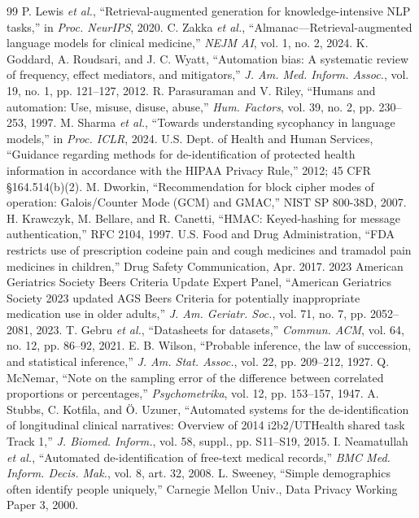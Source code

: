 \documentclass[journal]{IEEEtran}
\begin{document}
\begin{thebibliography}{99}
 P. Lewis \emph{et al.}, ``Retrieval-augmented generation for knowledge-intensive NLP tasks,'' in \emph{Proc. NeurIPS}, 2020.
 C. Zakka \emph{et al.}, ``Almanac---Retrieval-augmented language models for clinical medicine,'' \emph{NEJM AI}, vol. 1, no. 2, 2024.
 K. Goddard, A. Roudsari, and J. C. Wyatt, ``Automation bias: A systematic review of frequency, effect mediators, and mitigators,'' \emph{J. Am. Med. Inform. Assoc.}, vol. 19, no. 1, pp. 121--127, 2012.
 R. Parasuraman and V. Riley, ``Humans and automation: Use, misuse, disuse, abuse,'' \emph{Hum. Factors}, vol. 39, no. 2, pp. 230--253, 1997.
 M. Sharma \emph{et al.}, ``Towards understanding sycophancy in language models,'' in \emph{Proc. ICLR}, 2024.
 U.S. Dept. of Health and Human Services, ``Guidance regarding methods for de-identification of protected health information in accordance with the HIPAA Privacy Rule,'' 2012; 45 CFR \S164.514(b)(2).
 M. Dworkin, ``Recommendation for block cipher modes of operation: Galois/Counter Mode (GCM) and GMAC,'' NIST SP 800-38D, 2007.
 H. Krawczyk, M. Bellare, and R. Canetti, ``HMAC: Keyed-hashing for message authentication,'' RFC 2104, 1997.
 U.S. Food and Drug Administration, ``FDA restricts use of prescription codeine pain and cough medicines and tramadol pain medicines in children,'' Drug Safety Communication, Apr. 2017.
 2023 American Geriatrics Society Beers Criteria Update Expert Panel, ``American Geriatrics Society 2023 updated AGS Beers Criteria for potentially inappropriate medication use in older adults,'' \emph{J. Am. Geriatr. Soc.}, vol. 71, no. 7, pp. 2052--2081, 2023.
 T. Gebru \emph{et al.}, ``Datasheets for datasets,'' \emph{Commun. ACM}, vol. 64, no. 12, pp. 86--92, 2021.
 E. B. Wilson, ``Probable inference, the law of succession, and statistical inference,'' \emph{J. Am. Stat. Assoc.}, vol. 22, pp. 209--212, 1927.
 Q. McNemar, ``Note on the sampling error of the difference between correlated proportions or percentages,'' \emph{Psychometrika}, vol. 12, pp. 153--157, 1947.
 A. Stubbs, C. Kotfila, and \"{O}. Uzuner, ``Automated systems for the de-identification of longitudinal clinical narratives: Overview of 2014 i2b2/UTHealth shared task Track 1,'' \emph{J. Biomed. Inform.}, vol. 58, suppl., pp. S11--S19, 2015.
 I. Neamatullah \emph{et al.}, ``Automated de-identification of free-text medical records,'' \emph{BMC Med. Inform. Decis. Mak.}, vol. 8, art. 32, 2008.
 L. Sweeney, ``Simple demographics often identify people uniquely,'' Carnegie Mellon Univ., Data Privacy Working Paper 3, 2000.
\end{thebibliography}
\end{document}
